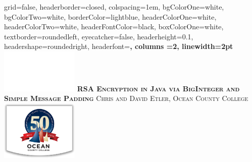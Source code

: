 \documentclass[landscape,fontscale=.8,paperwidth=24in,paperheight=18in]{baposter} %
\begin{document}
\begin{poster}
{
grid=false,
headerborder=closed, %
colspacing=1em, %
bgColorOne=white, %
bgColorTwo=white, %
borderColor=lightblue, %
headerColorOne=white, %
headerColorTwo=white, %
headerFontColor=black, %
boxColorOne=white, %
textborder=roundedleft, %
eyecatcher=false, %
headerheight=0.1\textheight, %
headershape=roundedright, %
headerfont=\Large\bf\textsc, %
columns =2,
linewidth=2pt %
}
%
{\includegraphics[width=10em]{blank.png}} %
{\bf\textsc{RSA Encryption in Java via BigInteger and Simple Message Padding}}%
{\textsc{ Chris and David Etler,  \hspace{12pt} Ocean County College}} %
{\includegraphics[width=10em]{occ.png}} %


\end{poster}
\end{document}
